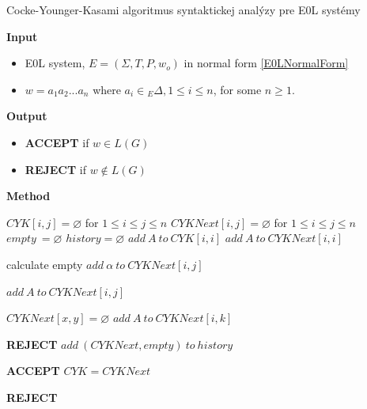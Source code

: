 \begin{algorithm}
\caption{Cocke-Younger-Kasami algoritmus syntaktickej analýzy pre E0L systémy}
\label{CYKE0L}

\textbf{Input}
\begin{itemize}[noitemsep]
    \item E0L system, \(E = (\Sigma, T, P, w_o)\) in normal form \ref{E0LNormalForm}
    \item \(w = a_1a_2...a_n\)  where  \(a_i \in {}_E\Delta, 1 \leq i \leq n \), for some \(n \geq 1\).
\end{itemize}
\textbf{Output} 
\begin{itemize}[noitemsep]
    \item \textbf{ACCEPT} if \(w \in L(G)\)
    \item \textbf{REJECT} if \(w\notin L(G)\)
\end{itemize}
\textbf{Method}
\begin{algorithmic}
\State $ CYK[i,j] = \varnothing$ for $1 \leq i \leq j \leq n $
\State $ CYKNext[i,j] = \varnothing$ for $1 \leq i \leq j \leq n $
\State $ empty\ = \varnothing$
\State $history = \varnothing$
        \State $add\ A\ to\ CYK[i,i]$
        \State $add\ A\ to\ CYKNext[i,i]$
    \EndIf
\EndFor

\Repeat
\State calculate empty
\State $add\ \alpha\ to\ CYKNext[i,j]$
\EndIf

\State $add\ A\ to\ CYKNext[i,j]$
\EndIf

\State $CYKNext[x,y] = \varnothing$
\Repeat
{}
\State $add\ A\ to\ CYKNext[i,k]$
\EndIf
{}

    \State \textbf{REJECT}
\Else
    \State $add\ (CYKNext, empty)\ to\ history$
\EndIf
    
    \State \textbf{ACCEPT}
\Else
    \State $ CYK = CYKNext$
\EndIf

\State \textbf{REJECT}

\end{algorithmic}
\end{algorithm}


